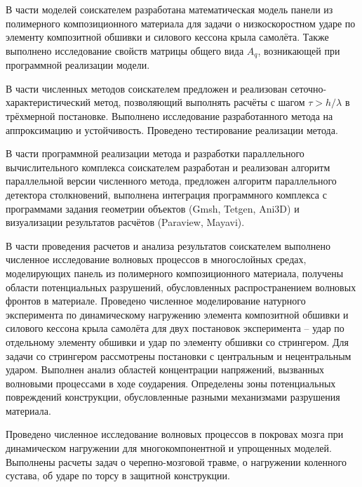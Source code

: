 В части моделей соискателем разработана математическая модель панели из полимерного композиционного материала для задачи о низкоскоростном ударе по элементу композитной обшивки и силового кессона крыла самолёта. Также выполнено исследование свойств матрицы общего вида $A_q$, возникающей при программной реализации модели.

В части численных методов соискателем предложен и реализован сеточно-характеристический метод, позволяющий выполнять расчёты с шагом $\tau > h / \lambda$ в трёхмерной постановке. Выполнено исследование разработанного метода на аппроксимацию и устойчивость. Проведено тестирование реализации метода.

В части программной реализации метода и разработки параллельного вычислительного комплекса соискателем разработан и реализован алгоритм параллельной версии численного метода, предложен алгоритм параллельного детектора столкновений, выполнена интеграция программного комплекса с программами задания геометрии объектов (Gmsh, Tetgen, Ani3D) \cite{gmsh} и визуализации результатов расчётов (Paraview, Mayavi).

В части проведения расчетов и анализа результатов соискателем выполнено численное исследование волновых процессов в многослойных средах, моделирующих панель из полимерного композиционного материала, получены области потенциальных разрушений, обусловленных распространением волновых фронтов в материале. Проведено численное моделирование натурного эксперимента по динамическому нагружению элемента композитной обшивки и силового кессона крыла самолёта для двух постановок эксперимента -- удар по отдельному элементу обшивки и удар по элементу обшивки со стрингером. Для задачи со стрингером рассмотрены постановки с центральным и нецентральным ударом. Выполнен анализ областей концентрации напряжений, вызванных волновыми процессами в ходе соударения. Определены зоны потенциальных повреждений конструкции, обусловленные разными механизмами разрушения материала.

Проведено численное исследование волновых процессов в покровах мозга при динамическом нагружении для многокомпонентной и упрощенных моделей. Выполнены расчеты задач о черепно-мозговой травме, о нагружении коленного сустава, об ударе по торсу в защитной конструкции.
